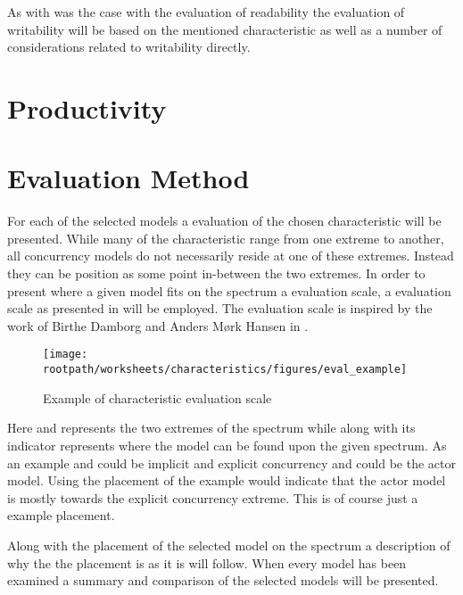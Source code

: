 As with was the case with the evaluation of readability the evaluation of writability will be based on the mentioned characteristic as well as a number of considerations related to writability directly.

\section{Productivity}

\section{Evaluation Method}
For each of the selected models a evaluation of the chosen characteristic will be presented. While many of the characteristic range from one extreme to another, all concurrency models do not necessarily reside at one of these extremes. Instead they can be position as some point in-between the two extremes. In order to present where a given model fits on the spectrum a evaluation scale, a evaluation scale as presented in  will be employed. The evaluation scale is inspired by the work of Birthe Damborg and Anders Mørk Hansen in \cite{StudyInConcurrency}.

\begin{figure}[ht!]
\centering
\texttt{[image: \\rootpath/worksheets/characteristics/figures/eval\_example]}
\caption{Example of characteristic evaluation scale}\label{fig:char_evel_example}
\end{figure}

Here  and  represents the two extremes of the spectrum while  along with its indicator represents where the model  can be found upon the given spectrum. As an example  and  could be implicit and explicit concurrency and  could be the actor model. Using the placement of the example  would indicate that the actor model is mostly towards the explicit concurrency extreme. This is of course just a example placement.

Along with the placement of the selected model on the spectrum a description of why the the placement is as it is will follow. When every model has been examined a summary and comparison of the selected models will be presented.
\worksheetend
